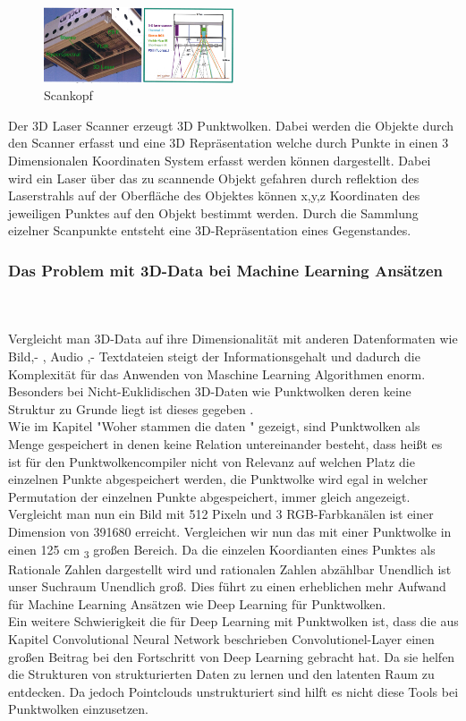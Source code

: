 \documentclass{llncs}
\begin{document}
	\begin{figure}[htbp] 
		\centering
		\includegraphics[width=0.5\textwidth]{lematech_2.png}
		\caption{Scankopf}
		\label{fig:Bild15}
	\end{figure}
	
	Der 3D Laser Scanner erzeugt 3D Punktwolken. Dabei werden die Objekte durch den Scanner erfasst und eine 3D Repräsentation welche durch Punkte in einen 3 Dimensionalen Koordinaten System erfasst werden können dargestellt. Dabei wird ein Laser über das zu scannende Objekt gefahren durch reflektion des Laserstrahls auf der Oberfläche des Objektes können x,y,z Koordinaten des jeweiligen Punktes auf den Objekt bestimmt werden. Durch die Sammlung eizelner Scanpunkte entsteht eine 3D-Repräsentation eines Gegenstandes. 
	
	
	\subsubsection{Das Problem mit 3D-Data bei Machine Learning Ansätzen}
	~\\\\
	Vergleicht man 3D-Data auf ihre Dimensionalität mit anderen Datenformaten wie Bild,- , Audio ,- Textdateien steigt der Informationsgehalt und dadurch die Komplexität für das Anwenden von Maschine Learning Algorithmen enorm. Besonders bei Nicht-Euklidischen 3D-Daten wie Punktwolken deren keine Struktur zu Grunde liegt ist dieses gegeben \cite{3dprob}.
	\\
	Wie im Kapitel "Woher stammen die daten " gezeigt, sind Punktwolken als Menge gespeichert in denen keine Relation untereinander besteht, dass heißt es ist für den Punktwolkencompiler nicht von Relevanz auf welchen Platz die einzelnen Punkte abgespeichert werden, die Punktwolke wird egal in welcher Permutation der einzelnen Punkte abgespeichert, immer gleich angezeigt. Vergleicht man nun ein Bild mit 512 Pixeln und 3 RGB-Farbkanälen ist einer Dimension von 391680 erreicht. Vergleichen wir nun das mit einer Punktwolke in einen 125 cm \textsubscript{3} großen Bereich. Da die einzelen Koordianten eines Punktes als Rationale Zahlen dargestellt wird und rationalen Zahlen abzählbar Unendlich ist unser Suchraum Unendlich groß. Dies führt zu einen erheblichen mehr Aufwand für Machine Learning Ansätzen wie Deep Learning für Punktwolken.
	\\
	Ein weitere Schwierigkeit die für Deep Learning mit Punktwolken ist, dass die aus Kapitel Convolutional Neural Network beschrieben Convolutionel-Layer einen großen Beitrag bei den Fortschritt von Deep Learning gebracht hat. Da sie helfen die Strukturen von strukturierten Daten zu lernen und den latenten Raum zu entdecken. Da jedoch Pointclouds unstrukturiert sind hilft es nicht diese Tools bei Punktwolken einzusetzen\cite{3dgan}.
\end{document}
